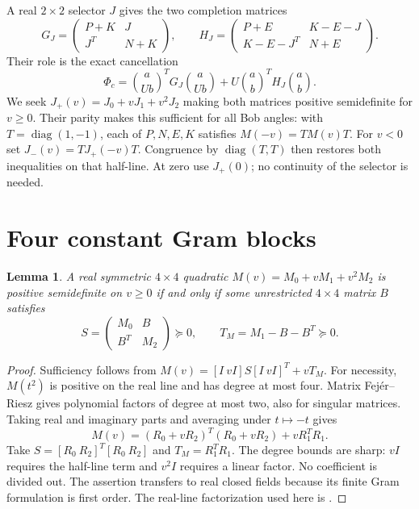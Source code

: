 \documentclass[11pt]{article}
\newtheorem{lemma}{Lemma}
\newcommand{\diag}{\operatorname{diag}}
\begin{document}
A real $2\times2$ selector $J$ gives the two completion matrices
\begin{equation}
 G_J=\begin{pmatrix}P+K&J\\J^T&N+K\end{pmatrix},\qquad
 H_J=\begin{pmatrix}P+E&K-E-J\\K-E-J^T&N+E\end{pmatrix}.     \label{eq:GH}
\end{equation}
Their role is the exact cancellation
\begin{equation}
 \Phi_c=\binom a{Ub}^{\!T}G_J\binom a{Ub}
                  +U\binom ab^{\!T}H_J\binom ab.           \label{eq:split}
\end{equation}
We seek $J_+(v)=J_0+vJ_1+v^2J_2$ making both matrices positive
semidefinite for $v\ge0$. Their parity makes this sufficient for all Bob
angles: with $T=\diag(1,-1)$, each of $P,N,E,K$ satisfies
$M(-v)=TM(v)T$. For $v<0$ set $J_-(v)=TJ_+(-v)T$.
Congruence by $\diag(T,T)$ then restores both inequalities on that half-line.
At zero use $J_+(0)$; no continuity of the selector is needed.

\section{Four constant Gram blocks}

\begin{lemma}\label{lem:halfline}
A real symmetric $4\times4$ quadratic $M(v)=M_0+vM_1+v^2M_2$
is positive semidefinite on $v\ge0$ if and only if some unrestricted
$4\times4$ matrix $B$ satisfies
\[
 S=\begin{pmatrix}M_0&B\\B^T&M_2\end{pmatrix}\succeq0,
 \qquad T_M=M_1-B-B^T\succeq0.
\]
\end{lemma}
\begin{proof}
Sufficiency follows from $M(v)=[I\ vI]S[I\ vI]^T+vT_M$.
For necessity, $M(t^2)$ is positive on the real line and has degree at
most four. Matrix Fej\'er--Riesz gives polynomial factors of degree at most
two, also for singular matrices. Taking real and imaginary parts and
averaging under $t\mapsto-t$ gives
\[
 M(v)=(R_0+vR_2)^T(R_0+vR_2)+vR_1^TR_1.
\]
Take $S=[R_0\ R_2]^T[R_0\ R_2]$ and $T_M=R_1^TR_1$.
The degree bounds are sharp: $vI$ requires the half-line term and $v^2I$
requires a linear factor. No coefficient is divided out. The assertion
transfers to real closed fields because its finite Gram formulation is
first order. The real-line factorization used here is
\cite[Theorem 1.2]{Zalar}.
\end{proof}
\end{document}
